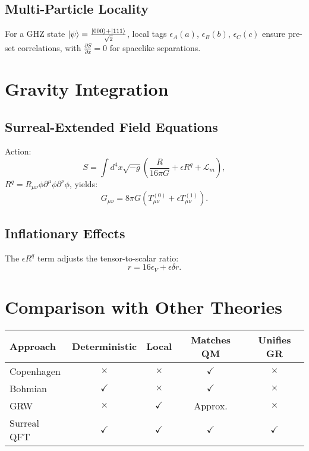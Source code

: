 \documentclass{article}
\begin{document}
\subsection{Multi-Particle Locality}
For a GHZ state \(\ket{\psi} = \frac{\ket{000} + \ket{111}}{\sqrt{2}}\), local tags \(\epsilon_A(a)\), \(\epsilon_B(b)\), \(\epsilon_C(c)\) ensure pre-set correlations, with \(\frac{\partial S}{\partial x} = 0\) for spacelike separations.

\section{Gravity Integration}
\subsection{Surreal-Extended Field Equations}
Action:
\begin{equation}
S = \int d^4x \sqrt{-g} \left( \frac{R}{16\pi G} + \epsilon R^q + \mathcal{L}_m \right),
\end{equation}
\(R^q = R_{\mu\nu} \phi \partial^\mu \phi \partial^\nu \phi\), yields:
\begin{equation}
G_{\mu\nu} = 8\pi G \left( T_{\mu\nu}^{(0)} + \epsilon T_{\mu\nu}^{(1)} \right).
\end{equation}

\subsection{Inflationary Effects}
The \(\epsilon R^q\) term adjusts the tensor-to-scalar ratio:
\begin{equation}
r = 16 \epsilon_V + \epsilon \delta r.
\end{equation}

\section{Comparison with Other Theories}
\begin{center}
\begin{tabular}{lcccc}
\hline
\textbf{Approach} & \textbf{Deterministic} & \textbf{Local} & \textbf{Matches QM} & \textbf{Unifies GR} \\
\hline
Copenhagen & $\times$ & $\times$ & $\checkmark$ & $\times$ \\
Bohmian & $\checkmark$ & $\times$ & $\checkmark$ & $\times$ \\
GRW & $\times$ & $\checkmark$ & Approx. & $\times$ \\
Surreal QFT & $\checkmark$ & $\checkmark$ & $\checkmark$ & $\checkmark$ \\
\hline
\end{tabular}
\end{center}
\end{document}
